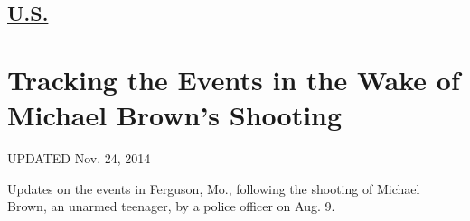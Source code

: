 \hypertarget{-us-}{%
\subsection{\texorpdfstring{
\href{https://www.nytimes.com/section/us}{U.S.} }{ U.S. }}\label{-us-}}

\hypertarget{tracking-the-events-in-the-wake-of-michael-browns-shooting}{%
\section{Tracking the Events in the Wake of Michael Brown's
Shooting}\label{tracking-the-events-in-the-wake-of-michael-browns-shooting}}

UPDATED Nov. 24, 2014

Updates on the events in Ferguson, Mo., following the shooting of
Michael Brown, an unarmed teenager, by a police officer on Aug. 9.

